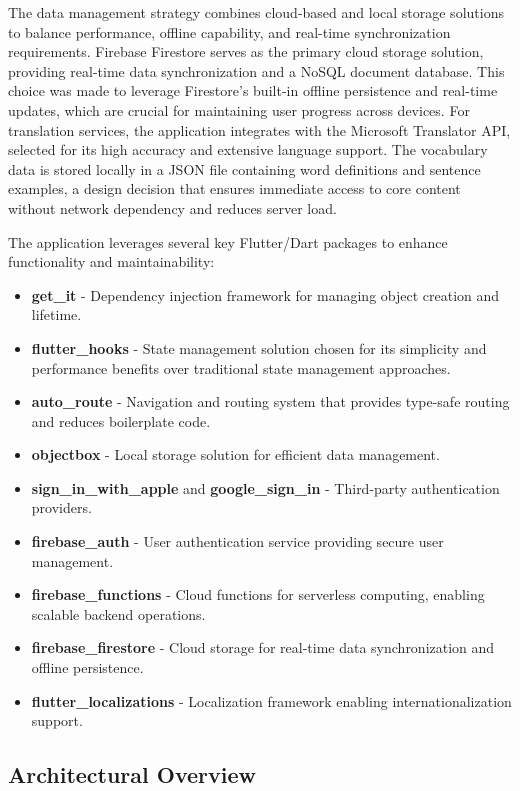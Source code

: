 The data management strategy combines cloud-based and local storage solutions to balance performance, offline capability, and real-time synchronization requirements. Firebase Firestore serves as the primary cloud storage solution, providing real-time data synchronization and a NoSQL document database. This choice was made to leverage Firestore's built-in offline persistence and real-time updates, which are crucial for maintaining user progress across devices. For translation services, the application integrates with the Microsoft Translator API, selected for its high accuracy and extensive language support. The vocabulary data is stored locally in a JSON file containing word definitions and sentence examples, a design decision that ensures immediate access to core content without network dependency and reduces server load.

The application leverages several key Flutter/Dart packages to enhance functionality and maintainability:
\begin{itemize}
    \item \textbf{get\_it} - Dependency injection framework for managing object creation and lifetime.
    \item \textbf{flutter\_hooks} - State management solution chosen for its simplicity and performance benefits over traditional state management approaches.
    \item \textbf{auto\_route} - Navigation and routing system that provides type-safe routing and reduces boilerplate code.
    \item \textbf{objectbox} - Local storage solution for efficient data management.
    \item \textbf{sign\_in\_with\_apple} and \textbf{google\_sign\_in} - Third-party authentication providers.
    \item \textbf{firebase\_auth} - User authentication service providing secure user management.
    \item \textbf{firebase\_functions} - Cloud functions for serverless computing, enabling scalable backend operations.
    \item \textbf{firebase\_firestore} - Cloud storage for real-time data synchronization and offline persistence.
    \item \textbf{flutter\_localizations} - Localization framework enabling internationalization support.
\end{itemize}

\subsection{Architectural Overview}

